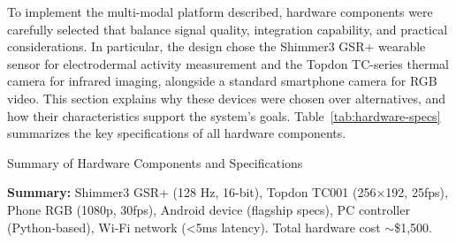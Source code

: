 \documentclass{report}
\begin{document}
    To implement the multi-modal platform described, hardware components were carefully selected that balance signal quality, integration capability, and practical considerations. In particular, the design chose the Shimmer3 GSR+ wearable sensor for electrodermal activity measurement and the Topdon TC-series thermal camera for infrared imaging, alongside a standard smartphone camera for RGB video. This section explains why these devices were chosen over alternatives, and how their characteristics support the system's goals. Table~\ref{tab:hardware-specs} summarizes the key specifications of all hardware components.

    \begin{table}[htbp]
        \centering
        \small
        \caption{Summary of Hardware Components and Specifications}
        \label{tab:hardware-specs}

        \vspace{0.3cm}
        \textbf{Summary:} Shimmer3 GSR+ (128 Hz, 16-bit), Topdon TC001 (256×192, 25fps), Phone RGB (1080p, 30fps), Android device (flagship specs), PC controller (Python-based), Wi-Fi network (<5ms latency). Total hardware cost $\sim$\$1,500.
    \end{table}
\end{document}
